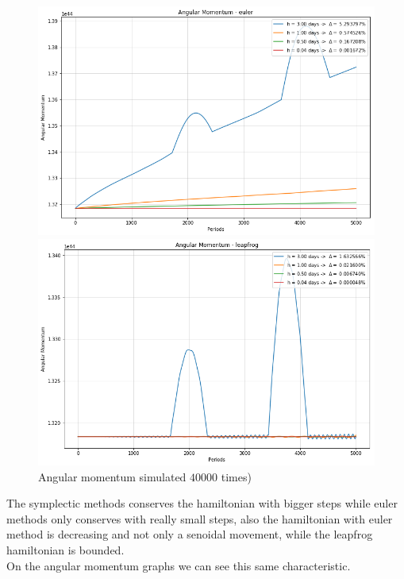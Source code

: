 \documentclass[12pt]{article}
\begin{document}
\begin{figure}[H]
  \includegraphics[width=.92\textwidth, height =.5\textheight]{an_euler.png}

  \includegraphics[width=.92\textwidth, height =.5\textheight]{an_leap.png}
  \caption{Angular momentum simulated \(40000\) times)}
  \label{Euler Method}
\end{figure}
The symplectic methods conserves the hamiltonian with bigger steps while euler methods only conserves with really small steps, also the hamiltonian with euler method is decreasing and not only a senoidal movement, while the leapfrog hamiltonian is bounded.\\
On the angular momentum graphs we can see this same characteristic.
\end{document}
